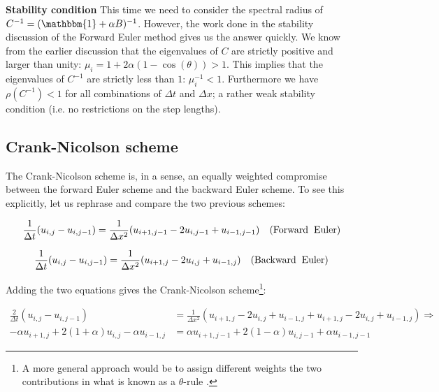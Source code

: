 \documentclass[a4paper, 11pt, notitlepage,english]{article}
\newcommand{\id}{\mathbbm{1}}
\begin{document}
\textbf{Stability condition} \newline
This time we need to consider the spectral radius of $C^{-1} = (\id + \alpha B)^{-1}$. However, the work done in the stability discussion of the Forward Euler method gives us the answer quickly. We know from the earlier discussion that the eigenvalues of $C$ are strictly positive and larger than unity: $\mu_i = 1 + 2\alpha(1-\cos(\theta)) > 1$. This implies that the eigenvalues of $C^{-1}$ are strictly less than $1$: $\mu_i^{-1} < 1$. Furthermore we have $\rho(C^{-1}) < 1$ for all combinations of $\Delta t$ and $\Delta x$; a rather weak stability condition (i.e. no restrictions on the step lengths).

\subsection{Crank-Nicolson scheme}
The Crank-Nicolson scheme is, in a sense, an equally weighted compromise between the forward Euler scheme and the backward Euler scheme. To see this explicitly, let us rephrase and compare the two previous schemes:

\begin{equation}
 \frac{1}{\Delta t} (u_{i,j}-u_{i,j-1}) = \frac{1}{\Delta x^2} (u_{i+1,j-1}-2u_{i,j-1}+u_{i-1,j-1}) \hspace{10pt} \mathrm{(Forward \hspace{2mm} Euler)}
\end{equation}

\begin{equation}
 \frac{1}{\Delta t} (u_{i,j}-u_{i,j-1}) = \frac{1}{\Delta x^2} (u_{i+1,j}-2u_{i,j}+u_{i-1,j}) \hspace{10pt} \mathrm{(Backward \hspace{2mm} Euler)}
\end{equation}

Adding the two equations gives the Crank-Nicolson scheme\footnote{A more general approach would be to assign different weights the two contributions in what is known as a $\theta$-rule \cite{Komp3150}.}:

\begin{align}
\frac{2}{\Delta t} (u_{i,j}-u_{i,j-1}) &= \frac{1}{\Delta x^2} (u_{i+1,j}-2u_{i,j}+u_{i-1,j}+u_{i+1,j}-2u_{i,j}+u_{i-1,j} ) \Rightarrow \\
 -\alpha u_{i+1,j} + 2(1+\alpha)u_{i,j} -\alpha u_{i-1,j} &= \alpha u_{i+1,j-1} + 2(1-\alpha) u_{i,j-1} + \alpha u_{i-1,j-1}
\label{eq:Crank_Nicoloson_scheme}
\end{align}
\end{document}
